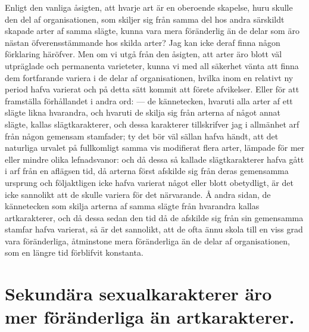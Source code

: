 Enligt den vanliga åsigten, att hvarje art är en oberoende skapelse, huru skulle den del af organisationen, som skiljer sig från samma del hos andra särskildt skapade arter af samma slägte, kunna vara mera föränderlig än de delar som äro nästan öfverensstämmande hos skilda arter? Jag kan icke deraf finna någon förklaring häröfver. Men om vi utgå från den åsigten, att arter äro blott väl utpräglade och permanenta varieteter, kunna vi med all säkerhet vänta att finna dem fortfarande variera i de delar af organisationen, hvilka inom en relativt ny period hafva varierat och på detta sätt kommit att förete afvikelser. Eller för att framställa förhållandet i andra ord: — de kännetecken, hvaruti alla arter af ett slägte likna hvarandra, och hvaruti de skilja sig från arterna af något annat slägte, kallas slägtkarakterer, och dessa karakterer tillskrifver jag i allmänhet arf från någon gemensam stamfader; ty det bör väl sällan hafva händt, att det naturliga urvalet på fullkomligt samma vis modifierat flera arter, lämpade för mer eller mindre olika lefnadsvanor: och då dessa så kallade slägtkarakterer hafva gått i arf från en aflägsen tid, då arterna först afskilde sig från deras gemensamma ursprung och följaktligen icke hafva varierat något eller blott obetydligt, är det icke sannolikt att de skulle variera för det närvarande. Å andra sidan, de kännetecken som skilja arterna af samma slägte från hvarandra kallas artkarakterer, och då dessa sedan den tid då de afskilde sig från sin gemensamma stamfar hafva varierat, så är det sannolikt, att de ofta ännu skola till en viss grad vara föränderliga, åtminstone mera föränderliga än de delar af organisationen, som en längre tid förblifvit konstanta.



\section[Sekundära sexualkarakterier]{Sekundära sexualkarakterer äro mer föränderliga
än artkarakterer.}

